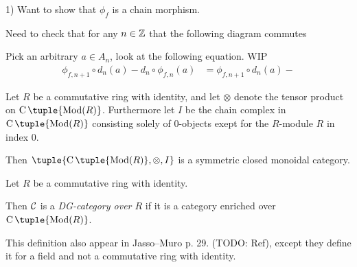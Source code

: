 \begin{remark}
    1) Want to show that \( \phi_f \) is a chain morphism.

    Need to check that for any \( n \in {\mathbb{Z}} \) that the following diagram commutes
    \begin{center}
    \end{center}
    Pick an arbitrary \( a \in A_n \), look at the following equation. WIP
    \begin{align*}
        \phi_{f, n + 1} \circ d_n(a) - d_n \circ \phi_{f, n}(a) &= \phi_{f, n + 1} \circ d_n(a) - 
    \end{align*}
\end{remark}

\begin{fact}
    Let \( R \) be a commutative ring with identity, and let \( \otimes \) denote the tensor product on \( \C \tuple{\Mod(R)} \). Furthermore let \( I \) be the chain complex in \( \C \tuple{\Mod(R)} \) consisting solely of \( 0 \)-objects exept for the \( R \)-module \( R \) in index \( 0 \).

    Then \( \tuple{\C \tuple{\Mod(R)}, \otimes, I} \) is a symmetric closed monoidal category.
\end{fact}

\begin{definition}[DG-category]
    Let \( R \) be a commutative ring with identity.

    Then \( {\mathcal{C}} \) is a \emph{DG-category over \( R \)} if it is a category enriched over \( \C \tuple{\Mod(R)} \).
\end{definition}
This definition also appear in Jasso--Muro p. 29. (TODO: Ref), except they define it for a field and not a commutative ring with identity.

